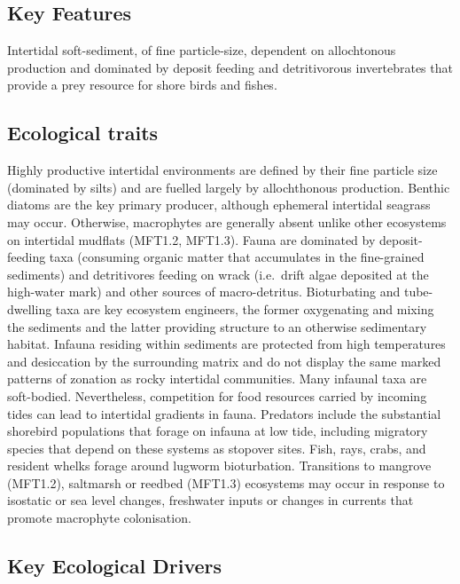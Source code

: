 \documentclass[
  letterpaper,
  DIV=11,
  numbers=noendperiod]{scrartcl}
\begin{document}
\subsection{Key Features}\label{key-features-53}

Intertidal soft-sediment, of fine particle-size, dependent on
allochtonous production and dominated by deposit feeding and
detritivorous invertebrates that provide a prey resource for shore birds
and fishes.

\subsection{Ecological traits}\label{ecological-traits-53}

Highly productive intertidal environments are defined by their fine
particle size (dominated by silts) and are fuelled largely by
allochthonous production. Benthic diatoms are the key primary producer,
although ephemeral intertidal seagrass may occur. Otherwise, macrophytes
are generally absent unlike other ecosystems on intertidal mudflats
(MFT1.2, MFT1.3). Fauna are dominated by deposit-feeding taxa (consuming
organic matter that accumulates in the fine-grained sediments) and
detritivores feeding on wrack (i.e.~drift algae deposited at the
high-water mark) and other sources of macro-detritus. Bioturbating and
tube-dwelling taxa are key ecosystem engineers, the former oxygenating
and mixing the sediments and the latter providing structure to an
otherwise sedimentary habitat. Infauna residing within sediments are
protected from high temperatures and desiccation by the surrounding
matrix and do not display the same marked patterns of zonation as rocky
intertidal communities. Many infaunal taxa are soft-bodied.
Nevertheless, competition for food resources carried by incoming tides
can lead to intertidal gradients in fauna. Predators include the
substantial shorebird populations that forage on infauna at low tide,
including migratory species that depend on these systems as stopover
sites. Fish, rays, crabs, and resident whelks forage around lugworm
bioturbation. Transitions to mangrove (MFT1.2), saltmarsh or reedbed
(MFT1.3) ecosystems may occur in response to isostatic or sea level
changes, freshwater inputs or changes in currents that promote
macrophyte colonisation.

\subsection{Key Ecological Drivers}\label{key-ecological-drivers-53}
\end{document}
